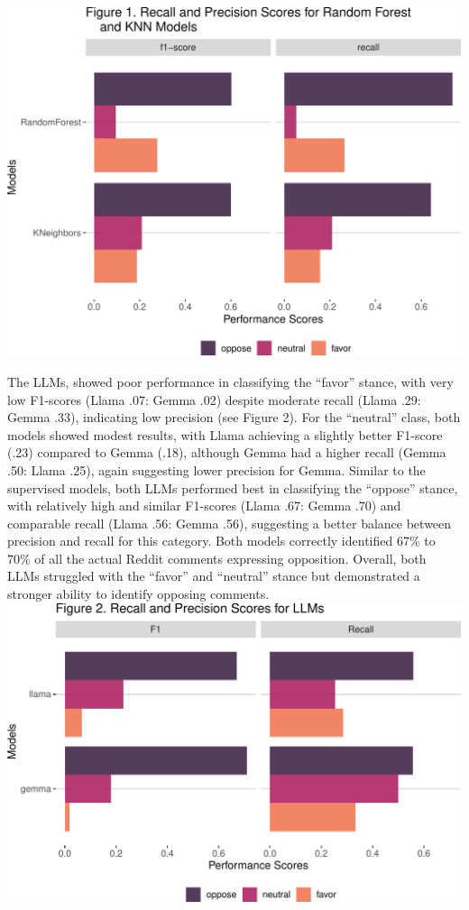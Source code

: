 \documentclass[
  12pt]{article}
\begin{document}
\includegraphics{assign_3_files/figure-pdf/unnamed-chunk-3-1.pdf}

\newpage

The LLMs, showed poor performance in classifying the ``favor'' stance,
with very low F1-scores (Llama .07: Gemma .02) despite moderate recall
(Llama .29: Gemma .33), indicating low precision (see Figure 2). For the
``neutral'' class, both models showed modest results, with Llama
achieving a slightly better F1-score (.23) compared to Gemma (.18),
although Gemma had a higher recall (Gemma .50: Llama .25), again
suggesting lower precision for Gemma. Similar to the supervised models,
both LLMs performed best in classifying the ``oppose'' stance, with
relatively high and similar F1-scores (Llama .67: Gemma .70) and
comparable recall (Llama .56: Gemma .56), suggesting a better balance
between precision and recall for this category. Both models correctly
identified 67\% to 70\% of all the actual Reddit comments expressing
opposition. Overall, both LLMs struggled with the ``favor'' and
``neutral'' stance but demonstrated a stronger ability to identify
opposing comments.\\

\includegraphics{assign_3_files/figure-pdf/unnamed-chunk-5-1.pdf}
\end{document}
